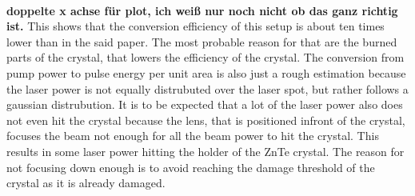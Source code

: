 \\
\textbf{doppelte x achse für plot, ich weiß nur noch nicht ob das ganz richtig ist.}  
This shows that the conversion efficiency of this setup is about ten times lower than in the said paper.
The most probable reason for that are the burned parts of the crystal, that lowers the efficiency of the crystal.
The conversion from pump power to pulse energy per unit area is also just a rough estimation because the laser power is not equally distrubuted over the laser spot, but rather follows a gaussian distrubution.
It is to be expected that a lot of the laser power also does not even hit the crystal because the lens, that is positioned infront of the crystal, focuses the beam not enough for all the beam power to hit the crystal.
This results in some laser power hitting the holder of the ZnTe crystal.
The reason for not focusing down enough is to avoid reaching the damage threshold of the crystal as it is already damaged.
\FloatBarrier
